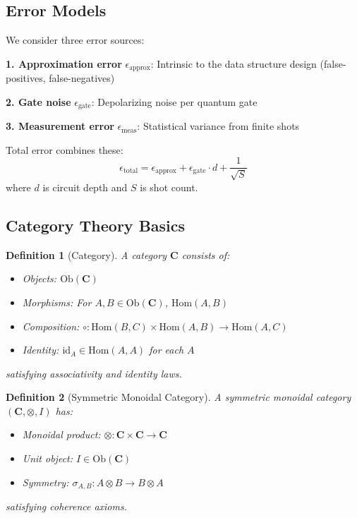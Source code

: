 \documentclass[11pt]{article}
\newtheorem{definition}{Definition}
\begin{document}
\subsection{Error Models}

We consider three error sources:

\textbf{1. Approximation error} $\epsilon_{\text{approx}}$: Intrinsic to the data structure design (false-positives, false-negatives)

\textbf{2. Gate noise} $\epsilon_{\text{gate}}$: Depolarizing noise per quantum gate

\textbf{3. Measurement error} $\epsilon_{\text{meas}}$: Statistical variance from finite shots

Total error combines these:
\begin{equation}
\epsilon_{\text{total}} = \epsilon_{\text{approx}} + \epsilon_{\text{gate}} \cdot d + \frac{1}{\sqrt{S}}
\end{equation}
where $d$ is circuit depth and $S$ is shot count.

\subsection{Category Theory Basics}

\begin{definition}[Category]
A category $\mathbf{C}$ consists of:
\begin{itemize}
\item Objects: $\text{Ob}(\mathbf{C})$
\item Morphisms: For $A, B \in \text{Ob}(\mathbf{C})$, $\text{Hom}(A, B)$
\item Composition: $\circ : \text{Hom}(B, C) \times \text{Hom}(A, B) \to \text{Hom}(A, C)$
\item Identity: $\text{id}_A \in \text{Hom}(A, A)$ for each $A$
\end{itemize}
satisfying associativity and identity laws.
\end{definition}

\begin{definition}[Symmetric Monoidal Category]
A symmetric monoidal category $(\mathbf{C}, \otimes, I)$ has:
\begin{itemize}
\item Monoidal product: $\otimes : \mathbf{C} \times \mathbf{C} \to \mathbf{C}$
\item Unit object: $I \in \text{Ob}(\mathbf{C})$
\item Symmetry: $\sigma_{A,B} : A \otimes B \to B \otimes A$
\end{itemize}
satisfying coherence axioms.
\end{definition}
\end{document}
